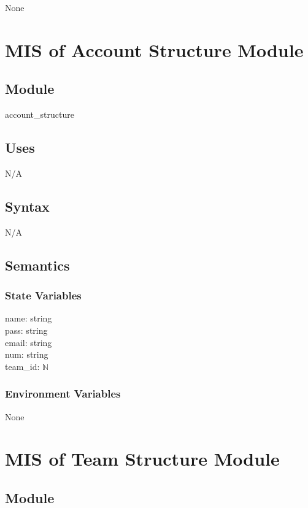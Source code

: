\documentclass[12pt, titlepage]{article}
\begin{document}
None

\newpage

\section{MIS of Account Structure Module} \label{mAS}

\subsection{Module}

account\_structure

\subsection{Uses}

N/A

\subsection{Syntax}

N/A

\subsection{Semantics}

\subsubsection{State Variables}

name: string\\
pass: string\\
email: string\\
num: string\\
team\_id: $\mathbb{N}$

\subsubsection{Environment Variables}

None

\newpage

\section{MIS of Team Structure Module} \label{mTS}

\subsection{Module}
\end{document}
